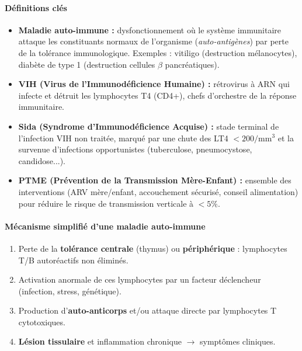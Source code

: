 \documentclass[11pt]{article}
\newcommand{\cle}[1]{{\popxbold\color{popdark}#1}}
\begin{document}
\begin{bilan}
\paragraph{Définitions clés}
\begin{itemize}
    \item \textbf{Maladie auto-immune :} dysfonctionnement où le système immunitaire attaque les constituants normaux de l'organisme (\emph{auto-antigènes}) par perte de la tolérance immunologique. Exemples : \cle{vitiligo} (destruction mélanocytes), \cle{diabète de type 1} (destruction cellules $\beta$ pancréatiques).
    \item \textbf{VIH (Virus de l'Immunodéficience Humaine) :} rétrovirus à ARN qui infecte et détruit les \cle{lymphocytes T4 (CD4+)}, chefs d'orchestre de la réponse immunitaire.
    \item \textbf{Sida (Syndrome d'Immunodéficience Acquise) :} stade terminal de l'infection VIH non traitée, marqué par une chute des LT4 $< 200/\text{mm}^3$ et la survenue d'\cle{infections opportunistes} (tuberculose, pneumocystose, candidose...).
    \item \textbf{PTME (Prévention de la Transmission Mère-Enfant) :} ensemble des interventions (ARV mère/enfant, accouchement sécurisé, conseil alimentation) pour réduire le risque de transmission verticale à $< 5\%$.
\end{itemize}

\paragraph{Mécanisme simplifié d'une maladie auto-immune}
\begin{enumerate}
    \item Perte de la \textbf{tolérance centrale} (thymus) ou \textbf{périphérique} : lymphocytes T/B autoréactifs non éliminés.
    \item Activation anormale de ces lymphocytes par un facteur déclencheur (infection, stress, génétique).
    \item Production d'\textbf{auto-anticorps} et/ou attaque directe par lymphocytes T cytotoxiques.
    \item \textbf{Lésion tissulaire} et inflammation chronique $\rightarrow$ symptômes cliniques.
\end{enumerate}


\end{bilan}
\end{document}
